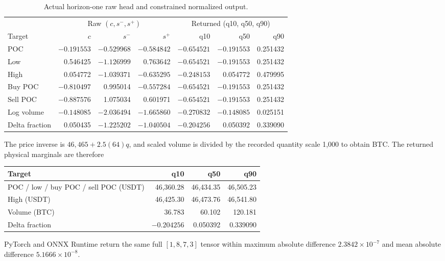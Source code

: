 \documentclass[10pt]{article}
\begin{document}
\begin{table}[H]
\centering
\footnotesize
\caption{Actual horizon-one raw head and constrained normalized output.}
\label{tab:fixture-output}
\begin{tabular}{@{}l rrr rrr@{}}
\toprule
& \multicolumn{3}{c}{Raw $(c,s^-,s^+)$} & \multicolumn{3}{c}{Returned (q10, q50, q90)} \\
Target & $c$ & $s^-$ & $s^+$ & q10 & q50 & q90 \\
\midrule
POC & $-0.191553$ & $-0.529968$ & $-0.584842$ & $-0.654521$ & $-0.191553$ & 0.251432 \\
Low & 0.546425 & $-1.126999$ & 0.763642 & $-0.654521$ & $-0.191553$ & 0.251432 \\
High & 0.054772 & $-1.039371$ & $-0.635295$ & $-0.248153$ & 0.054772 & 0.479995 \\
Buy POC & $-0.810497$ & 0.995014 & $-0.557284$ & $-0.654521$ & $-0.191553$ & 0.251432 \\
Sell POC & $-0.887576$ & 1.075034 & 0.601971 & $-0.654521$ & $-0.191553$ & 0.251432 \\
Log volume & $-0.148085$ & $-2.036494$ & $-1.665860$ & $-0.270832$ & $-0.148085$ & 0.025151 \\
Delta fraction & 0.050435 & $-1.225202$ & $-1.040504$ & $-0.204256$ & 0.050392 & 0.339090 \\
\bottomrule
\end{tabular}
\end{table}

The price inverse is $46{,}465+2.5(64)q$, and scaled volume is divided by the recorded quantity scale
1,000 to obtain BTC. The returned physical marginals are therefore
\begin{center}
\begin{tabular}{@{}lrrr@{}}
\toprule
Target & q10 & q50 & q90 \\
\midrule
POC / low / buy POC / sell POC (USDT) & 46,360.28 & 46,434.35 & 46,505.23 \\
High (USDT) & 46,425.30 & 46,473.76 & 46,541.80 \\
Volume (BTC) & 36.783 & 60.102 & 120.181 \\
Delta fraction & $-0.204256$ & 0.050392 & 0.339090 \\
\bottomrule
\end{tabular}
\end{center}
PyTorch and ONNX Runtime return the same full $[1,8,7,3]$ tensor within maximum absolute difference
$2.3842\times10^{-7}$ and mean absolute difference $5.1666\times10^{-8}$.
\end{document}
